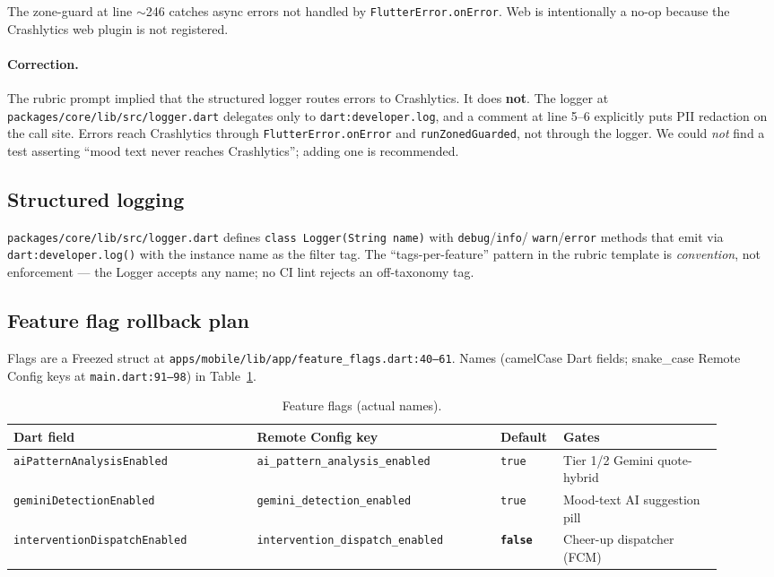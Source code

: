 \documentclass[11pt,a4paper]{article}
\begin{document}
The zone-guard at line $\sim$246 catches async errors not handled by
\texttt{FlutterError.onError}. Web is intentionally a no-op because the
Crashlytics web plugin is not registered.

\paragraph{Correction.} The rubric prompt implied that the structured
logger routes errors to Crashlytics. It does \textbf{not}. The logger
at \texttt{packages/core/lib/src/logger.dart} delegates only to
\texttt{dart:developer.log}, and a comment at line 5--6 explicitly puts
PII redaction on the call site. Errors reach Crashlytics through
\texttt{FlutterError.onError} and \texttt{runZonedGuarded}, not through
the logger. We could \emph{not} find a test asserting ``mood text never
reaches Crashlytics''; adding one is recommended.

\subsection{Structured logging}

\texttt{packages/core/lib/src/logger.dart} defines
\texttt{class Logger(String name)} with \texttt{debug}/\texttt{info}/
\texttt{warn}/\texttt{error} methods that emit via
\texttt{dart:developer.log()} with the instance name as the
filter tag. The ``tags-per-feature'' pattern in the rubric template is
\emph{convention}, not enforcement --- the Logger accepts any name; no
CI lint rejects an off-taxonomy tag.

\subsection{Feature flag rollback plan}

Flags are a Freezed struct at \texttt{apps/mobile/lib/app/feature\_flags.dart:40--61}.
Names (camelCase Dart fields; snake\_case Remote Config keys at
\texttt{main.dart:91--98}) in Table~\ref{tab:flags}.

\begin{table}[h]
\caption{Feature flags (actual names).}\label{tab:flags}
\small
\begin{tabular}{@{}p{0.32\linewidth} p{0.32\linewidth} p{0.07\linewidth} p{0.21\linewidth}@{}}
\toprule
\textbf{Dart field} & \textbf{Remote Config key} & \textbf{Default} & \textbf{Gates} \\
\midrule
\texttt{aiPatternAnalysisEnabled}  & \texttt{ai\_pattern\_analysis\_enabled} & \texttt{true}  & Tier 1/2 Gemini quote-hybrid \\
\texttt{geminiDetectionEnabled}    & \texttt{gemini\_detection\_enabled}    & \texttt{true}  & Mood-text AI suggestion pill \\
\texttt{interventionDispatchEnabled}& \texttt{intervention\_dispatch\_enabled}& \textbf{\texttt{false}} & Cheer-up dispatcher (FCM) \\
\bottomrule
\end{tabular}
\end{table}
\end{document}
